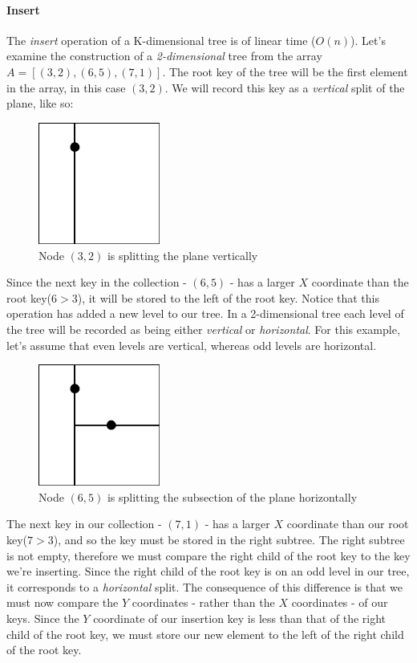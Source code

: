 \documentclass{article}
\begin{document}
{\paragraph{Insert}
The {\em insert} operation of a K-dimensional tree is of linear time (\(O(n)\)).
Let's examine the construction of a {\em 2-dimensional} tree from the array \(A = [(3, 2), (6, 5), (7, 1)]\).
The root key of the tree will be the first element in the array, in this case \((3, 2)\).
We will record this key as a {\em vertical} split of the plane, like so:

\begin{figure}[H]
  \centering
  \includegraphics[width=4cm]{2d_tree_0}
  \caption{Node \((3, 2)\) is splitting the plane vertically}
\end{figure}

Since the next key in the collection - \((6, 5)\) - has a larger \(X\) coordinate than the root key(\(6 > 3\)),
it will be stored to the left of the root key. Notice that this operation has added a new level to our tree.
In a 2-dimensional tree each level of the tree will be recorded as being either {\em vertical} or {\em horizontal}.
For this example, let's assume that even levels are vertical, whereas odd levels are horizontal.

\begin{figure}[H]
  \centering
  \includegraphics[width=4cm]{2d_tree_1}
  \caption{Node \((6, 5)\) is splitting the subsection of the plane horizontally}
\end{figure}

The next key in our collection - \((7, 1)\) - has a larger \(X\) coordinate than our root key(\(7 > 3\)),
and so the key must be stored in the right subtree. The right subtree is not empty,
therefore we must compare the right child of the root key to the key we're inserting.
Since the right child of the root key is on an odd level in our tree, it corresponds to a {\em horizontal} split.
The consequence of this difference is that we must now compare the \(Y\) coordinates - rather than the \(X\)
coordinates - of our keys. Since the \(Y\) coordinate of our insertion key is less than that of the right child
of the root key, we must store our new element to the left of the right child of the root key.

}
\end{document}
